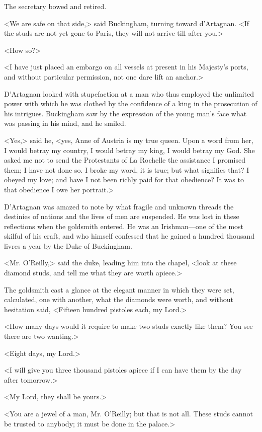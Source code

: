 The secretary bowed and retired. 

<We are safe on that side,> said Buckingham, turning toward d'Artagnan. <If the studs are not yet gone to Paris, they will not arrive till after you.> 

<How so?> 

<I have just placed an embargo on all vessels at present in his Majesty's ports, and without particular permission, not one dare lift an anchor.> 

D'Artagnan looked with stupefaction at a man who thus employed the unlimited power with which he was clothed by the confidence of a king in the prosecution of his intrigues. Buckingham saw by the expression of the young man's face what was passing in his mind, and he smiled. 

<Yes,> said he, <yes, Anne of Austria is my true queen. Upon a word from her, I would betray my country, I would betray my king, I would betray my God. She asked me not to send the Protestants of La Rochelle the assistance I promised them; I have not done so. I broke my word, it is true; but what signifies that? I obeyed my love; and have I not been richly paid for that obedience? It was to that obedience I owe her portrait.> 

D'Artagnan was amazed to note by what fragile and unknown threads the destinies of nations and the lives of men are suspended. He was lost in these reflections when the goldsmith entered. He was an Irishman---one of the most skilful of his craft, and who himself confessed that he gained a hundred thousand livres a year by the Duke of Buckingham. 

<Mr. O'Reilly,> said the duke, leading him into the chapel, <look at these diamond studs, and tell me what they are worth apiece.> 

The goldsmith cast a glance at the elegant manner in which they were set, calculated, one with another, what the diamonds were worth, and without hesitation said, <Fifteen hundred pistoles each, my Lord.> 

<How many days would it require to make two studs exactly like them? You see there are two wanting.> 

<Eight days, my Lord.> 

<I will give you three thousand pistoles apiece if I can have them by the day after tomorrow.> 

<My Lord, they shall be yours.> 

<You are a jewel of a man, Mr. O'Reilly; but that is not all. These studs cannot be trusted to anybody; it must be done in the palace.> 


